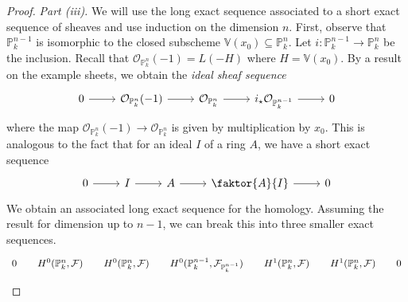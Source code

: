 \begin{proof}
	\emph{Part (iii).}
	We will use the long exact sequence associated to a short exact sequence of sheaves and use induction on the dimension \( n \).
	First, observe that \( \mathbb P^{n-1}_k \) is isomorphic to the closed subscheme \( \mathbb V(x_0) \subseteq \mathbb P^n_k \).
	Let \( i : \mathbb P^{n-1}_k \to \mathbb P^n_k \) be the inclusion.
	Recall that \( \mathcal O_{\mathbb P^n_k}(-1) = L(-H) \) where \( H = \mathbb V(x_0) \).
	By a result on the example sheets, we obtain the \emph{ideal sheaf sequence}
\[\begin{tikzcd}
	0 & {\mathcal O_{\mathbb P^n_k}(-1)} & {\mathcal O_{\mathbb P^n_k}} & {i_\star \mathcal O_{\mathbb P^{n-1}_k}} & 0
	\arrow[from=1-1, to=1-2]
	\arrow[from=1-2, to=1-3]
	\arrow[from=1-3, to=1-4]
	\arrow[from=1-4, to=1-5]
\end{tikzcd}\]
	where the map \( \mathcal O_{\mathbb P^n_k}(-1) \to \mathcal O_{\mathbb P^n_k} \) is given by multiplication by \( x_0 \).
	This is analogous to the fact that for an ideal \( I \) of a ring \( A \), we have a short exact sequence
\[\begin{tikzcd}
	0 & I & A & {\faktor{A}{I}} & 0
	\arrow[from=1-1, to=1-2]
	\arrow[from=1-2, to=1-3]
	\arrow[from=1-3, to=1-4]
	\arrow[from=1-4, to=1-5]
\end{tikzcd}\]
	We obtain an associated long exact sequence for the homology.
	Assuming the result for dimension up to \( n - 1 \), we can break this into three smaller exact sequences.
	\begin{equation}
		\begin{tikzcd}[column sep=small]
	0 & {H^0(\mathbb P^n_k, \mathcal F)} & {H^0(\mathbb P^n_k, \mathcal F)} & {H^0(\mathbb P^{n-1}_k, \mathcal F_{\mathbb P^{n-1}_k})} & {H^1(\mathbb P^n_k, \mathcal F)} & {H^1(\mathbb P^n_k, \mathcal F)} & 0

\end{tikzcd}
\end{equation}
\end{proof}
